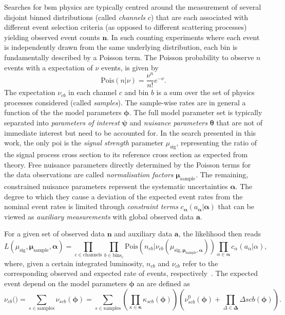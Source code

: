 Searches for \gls{bsm} physics are typically centred around the measurement of several disjoint binned distributions (called \textit{channels} $c$) that are each associated with different event selection criteria (as opposed to different scattering processes) yielding observed event counts $\boldsymbol{n}$. In such counting experiments where each event is independently drawn from the same underlying distribution, each bin is fundamentally described by a Poisson term. The Poisson probability to observe $n$ events with a expectation of $\nu$ events, is given by
\begin{equation}
	\mathrm{Pois}(n\vert\nu) = \frac{\nu^n}{n!}e^{-\nu}.
\end{equation}
The expectation $\nu_{cb}$ in each channel $c$ and bin $b$ is a sum over the set of physics processes considered (called \textit{samples}). The sample-wise rates are in general a function of the the model parameters $\boldsymbol{\phi}$. The full model parameter set is typically separated into \textit{parameters of interest} $\boldsymbol{\psi}$ and \textit{nuisance parameters} $\boldsymbol{\theta}$ that are not of immediate interest but need to be accounted for. In the search presented in this work, the only \gls{poi} is the \textit{signal strength} parameter $\mu_{\mathrm{sig}}$, representing the ratio of the signal process cross section to its reference cross section as expected from theory. Free nuisance parameters directly determined by the Poisson terms for the data observations are called \textit{normalisation factors} $\boldsymbol{\mu_\mathrm{sample}}$. The remaining, constrained nuisance parameters represent the systematic uncertainties $\boldsymbol{\alpha}$. The degree to which they cause a deviation of the expected event rates from the nominal event rates is limited through \textit{constraint terms} $c_{\boldsymbol{\alpha}}(a_{\boldsymbol{\alpha}}\vert\boldsymbol{\alpha})$ that can be viewed as \textit{auxiliary measurements} with global observed data $\boldsymbol{a}$. 

For a given set of observed data $\boldsymbol{n}$ and auxiliary data $\boldsymbol{a}$, the likelihood then reads
\begin{equation}
	L (\mu_{\mathrm{sig}}, \boldsymbol{\mu_\mathrm{sample}}, \boldsymbol{\alpha}) = \prod_{c\in\mathrm{channels}} \prod_{b\in\mathrm{bins_c}} \mathrm{Pois}(n_{cb}\vert\nu_{cb}(\mu_{\mathrm{sig}, \boldsymbol{\mu_\mathrm{sample}}, \boldsymbol{\alpha}})) \prod_{\alpha\in\boldsymbol{\alpha}}c_\alpha (a_\alpha\vert\alpha),
\end{equation}
where, given a certain integrated luminosity, $n_{cb}$ and $\nu_{cb}$ refer to the corresponding observed and expected rate of events, respectively~\cite{ATL-PHYS-PUB-2019-029}. The expected event depend on the model parameters $\boldsymbol{\phi}$ an are defined as
\begin{equation}
	\nu_{cb}(\boldsymbol) = \sum_{s\in\mathrm{samples}}{}\nu_{scb}(\boldsymbol{\phi}) = \sum_{s\in\mathrm{samples}}{(\prod_{\kappa\in\boldsymbol{\kappa}}\kappa_{scb}(\boldsymbol{\phi}))(\nu^0_{scb}(\boldsymbol{\phi})+\prod_{\Delta\in\boldsymbol{\Delta}}\Delta{scb}(\boldsymbol{\phi}))}.
\end{equation} 


